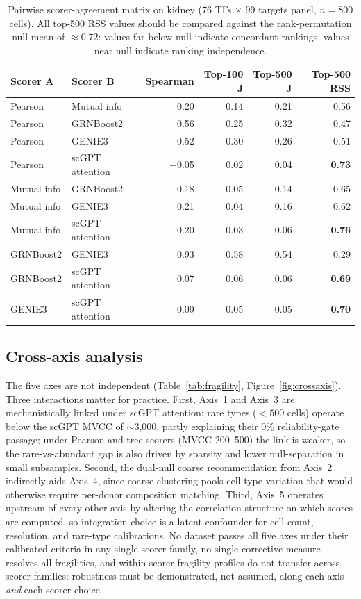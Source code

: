\documentclass[unnumsec,webpdf,contemporary,large,namedate]{oup-authoring-template}
\begin{document}
\begin{table}[ht]
\centering
\caption{Pairwise scorer-agreement matrix on kidney
(76 TFs $\times$ 99 targets panel, $n = 800$ cells). All top-500 RSS
values should be compared against the rank-permutation null mean of
$\approx 0.72$: values far below null indicate concordant rankings,
values near null indicate ranking independence.}
\label{tab:scorer_divergence}
\small
\begin{tabular}{llrrrr}
\toprule
\textbf{Scorer A} & \textbf{Scorer B} & \textbf{Spearman} & \textbf{Top-100 J} & \textbf{Top-500 J} & \textbf{Top-500 RSS} \\
\midrule
Pearson & Mutual info        & 0.20  & 0.14 & 0.21 & 0.56 \\
Pearson & GRNBoost2          & 0.56  & 0.25 & 0.32 & 0.47 \\
Pearson & GENIE3             & 0.52  & 0.30 & 0.26 & 0.51 \\
Pearson & scGPT attention    & $-$0.05 & 0.02 & 0.04 & \textbf{0.73} \\
Mutual info & GRNBoost2      & 0.18  & 0.05 & 0.14 & 0.65 \\
Mutual info & GENIE3         & 0.21  & 0.04 & 0.16 & 0.62 \\
Mutual info & scGPT attention & 0.20 & 0.03 & 0.06 & \textbf{0.76} \\
GRNBoost2 & GENIE3           & 0.93  & 0.58 & 0.54 & 0.29 \\
GRNBoost2 & scGPT attention  & 0.07  & 0.06 & 0.06 & \textbf{0.69} \\
GENIE3 & scGPT attention     & 0.09  & 0.05 & 0.05 & \textbf{0.70} \\
\bottomrule
\end{tabular}
\end{table}

\subsection{Cross-axis analysis}

The five axes are not independent
(Table~\ref{tab:fragility}, Figure~\ref{fig:crossaxis}). Three
interactions matter for practice. First, Axis~1 and Axis~3 are
mechanistically linked under scGPT attention: rare types ($<\!500$
cells) operate below the scGPT MVCC of $\sim$3{,}000, partly
explaining their 0\% reliability-gate passage; under Pearson and tree
scorers (MVCC 200--500) the link is weaker, so the rare-vs-abundant
gap is also driven by sparsity and lower null-separation in small
subsamples. Second, the dual-null coarse recommendation from Axis~2
indirectly aids Axis~4, since coarse clustering pools cell-type
variation that would otherwise require per-donor composition matching.
Third, Axis~5 operates upstream of every other axis by altering the
correlation structure on which scores are computed, so integration
choice is a latent confounder for cell-count, resolution, and rare-type
calibrations. No dataset passes all five axes under their calibrated
criteria in any single scorer family, no single corrective measure
resolves all fragilities, and within-scorer fragility profiles do not
transfer across scorer families: robustness must be demonstrated, not
assumed, along each axis \emph{and} each scorer choice.
\end{document}
